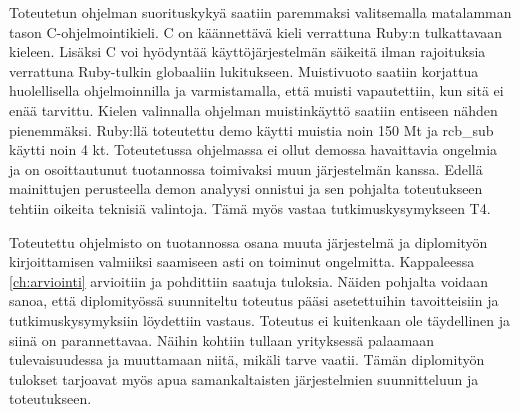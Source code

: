 Toteutetun ohjelman suorituskykyä saatiin paremmaksi valitsemalla matalamman tason C-ohjelmointikieli. C on käännettävä kieli verrattuna Ruby:n tulkattavaan kieleen. Lisäksi C voi hyödyntää käyttöjärjestelmän säikeitä ilman rajoituksia verrattuna Ruby-tulkin globaaliin lukitukseen. Muistivuoto saatiin korjattua huolellisella ohjelmoinnilla ja varmistamalla, että muisti vapautettiin, kun sitä ei enää tarvittu. Kielen valinnalla ohjelman muistinkäyttö saatiin entiseen nähden pienemmäksi. Ruby:llä toteutettu demo käytti muistia noin 150 Mt ja rcb\_sub käytti noin 4 kt. Toteutetussa ohjelmassa ei ollut demossa havaittavia ongelmia ja on osoittautunut tuotannossa toimivaksi muun järjestelmän kanssa. Edellä mainittujen perusteella demon analyysi onnistui ja sen pohjalta toteutukseen tehtiin oikeita teknisiä valintoja. Tämä myös vastaa tutkimuskysymykseen T4.

Toteutettu ohjelmisto on tuotannossa osana muuta järjestelmä ja diplomityön kirjoittamisen valmiiksi saamiseen asti on toiminut ongelmitta. Kappaleessa \ref{ch:arviointi} arvioitiin ja pohdittiin saatuja tuloksia. Näiden pohjalta voidaan sanoa, että diplomityössä suunniteltu toteutus pääsi asetettuihin tavoitteisiin ja tutkimuskysymyksiin löydettiin vastaus. Toteutus ei kuitenkaan ole täydellinen ja siinä on parannettavaa. Näihin kohtiin tullaan yrityksessä palaamaan tulevaisuudessa ja muuttamaan niitä, mikäli tarve vaatii. Tämän diplomityön tulokset tarjoavat myös apua samankaltaisten järjestelmien suunnitteluun ja toteutukseen.